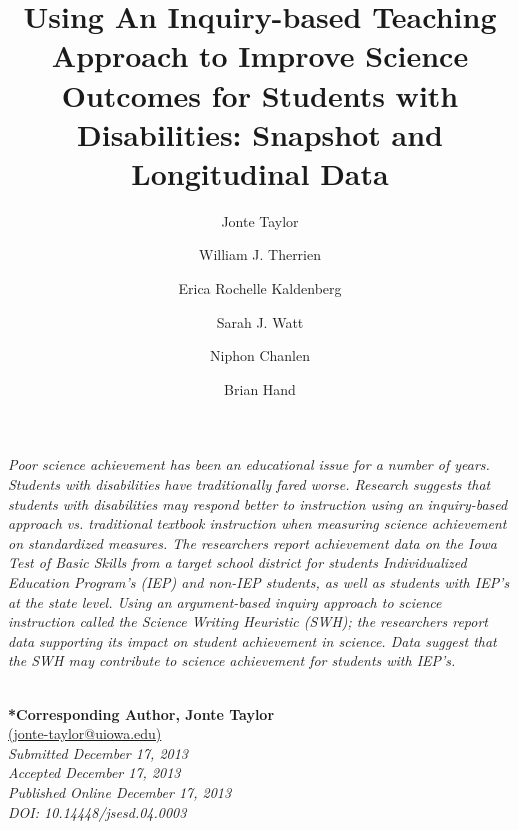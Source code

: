 \documentclass[11.5pt]{sig-alternate} %
\makeatletter
\let\oldabstract\abstract
\let\oldendabstract\endabstract
\renewenvironment{abstract} %
{\renewenvironment{quotation}%
               {\list{}{\addtolength{\leftmargin}{1em} %
                        \listparindent 1.5em%
                        \itemindent    \listparindent%
                        \rightmargin   \leftmargin%
                        \parsep        \z@ \@plus\p@}%
                \item\relax}%
               {\endlist}%
\oldabstract}
{\oldendabstract}
\makeatother
\begin{document}
\title{Using An Inquiry-based Teaching Approach to Improve Science Outcomes for Students with Disabilities: Snapshot and Longitudinal Data}

\author[1]{\large \color{blue} Jonte Taylor}
\author[1]{\large \color{blue} William J. Therrien}
\author[1]{\large \color{blue} Erica Rochelle Kaldenberg}
\author[1]{\large \color{blue} Sarah J. Watt}
\author[1]{\large \color{blue} Niphon Chanlen}
\author[1]{\large \color{blue} Brian Hand}


\toappear{}

\maketitle
\begin{@twocolumnfalse} 
\begin{abstract}
\item 
\begin{large}
\textit{Poor science achievement has been an educational issue for a number of years. Students with disabilities have traditionally fared worse. Research suggests that students with disabilities may respond better to instruction using an inquiry-based approach vs. traditional textbook instruction when measuring science achievement on standardized measures. The researchers report achievement data on the Iowa Test of Basic Skills from a target school district for students Individualized Education Program’s (IEP) and non-IEP students, as well as students with IEP’s at the state level. Using an argument-based inquiry approach to science instruction called the Science Writing Heuristic (SWH); the researchers report data supporting its impact on student achievement in science. Data suggest that the SWH may contribute to science achievement for students with IEP’s.}
\\ \\

\end{large}     
\end{abstract}
\end{@twocolumnfalse}



\textbf{*Corresponding Author, Jonte Taylor}\\
\href{mailto:jonte-taylor@uiowa.edu}{(jonte-taylor@uiowa.edu)}\\
\textit{Submitted December 17, 2013}\\
\textit{Accepted December 17, 2013}\\
\textit{Published Online December 17, 2013}\\
\textit{DOI: 10.14448/jsesd.04.0003}\\
\end{document}
